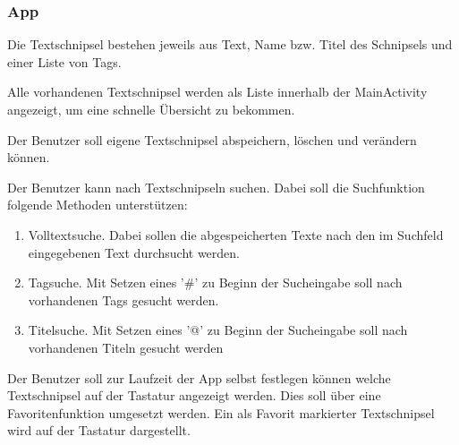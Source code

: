 \documentclass[11pt]{article}
\begin{document}
	\subsubsection{App}
	\begin{FA}
		\item \label{fa:1} Die Textschnipsel bestehen jeweils aus Text, Name bzw. Titel des Schnipsels und einer Liste von Tags.
		\item \label{fa:2} Alle vorhandenen Textschnipsel werden als Liste innerhalb der MainActivity angezeigt, um eine schnelle Übersicht zu bekommen.
		\item \label{fa:3} Der Benutzer soll eigene Textschnipsel abspeichern, löschen und verändern können.
		\item \label{fa:4} Der Benutzer kann nach Textschnipseln suchen. Dabei soll die Suchfunktion folgende Methoden unterstützen:
		\begin{enumerate}
			\item Volltextsuche. Dabei sollen die abgespeicherten Texte nach den im Suchfeld eingegebenen Text durchsucht werden.
			\item Tagsuche. Mit Setzen eines '\#' zu Beginn der Sucheingabe soll nach vorhandenen Tags gesucht werden.
			\item Titelsuche. Mit Setzen eines '@' zu Beginn der Sucheingabe soll nach vorhandenen Titeln gesucht werden
		\end{enumerate}
		\item \label{fa:5} Der Benutzer soll zur Laufzeit der App selbst festlegen können welche Textschnipsel auf der Tastatur angezeigt werden. Dies soll über eine Favoritenfunktion umgesetzt werden. Ein als Favorit markierter Textschnipsel wird auf der Tastatur dargestellt.
	\end{FA}
	
\end{document}

